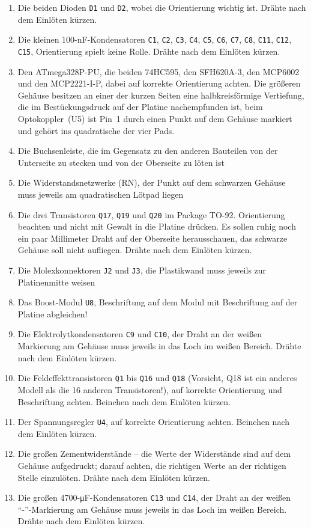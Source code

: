 \documentclass[paper=a4, open=any]{scrbook}
\begin{document}
\begin{enumerate}
						\item Die beiden Dioden \texttt{D1} und \texttt{D2}, wobei die Orientierung wichtig ist. Drähte nach dem Einlöten kürzen.
						\item Die kleinen 100-nF-Kondensatoren \texttt{C1}, \texttt{C2}, \texttt{C3}, \texttt{C4}, \texttt{C5}, \texttt{C6}, \texttt{C7}, \texttt{C8}, \texttt{C11}, \texttt{C12}, \texttt{C15}, Orientierung spielt keine Rolle. Drähte nach dem Einlöten kürzen.
						\item Den ATmega328P-PU, die beiden 74HC595, den SFH620A-3, den MCP6002 und den MCP2221-I-P, dabei auf korrekte Orientierung achten. Die größeren Gehäuse besitzen an einer der kurzen Seiten eine halbkreisförmige Vertiefung, die im Bestückungsdruck auf der Platine nachempfunden ist, beim Optokoppler~(U5) ist Pin~1 durch einen Punkt auf dem Gehäuse markiert und gehört ins quadratische der vier Pads.
						\item Die Buchsenleiste, die im Gegensatz zu den anderen Bauteilen von der Unterseite zu stecken und von der Oberseite zu löten ist
						\item Die Widerstandsnetzwerke (RN), der Punkt auf dem schwarzen Gehäuse muss jeweils am quadratischen Lötpad liegen
						\item Die drei Transistoren \texttt{Q17}, \texttt{Q19} und \texttt{Q20} im Package TO-92. Orientierung beachten und nicht mit Gewalt in die Platine drücken. Es sollen ruhig noch ein paar Millimeter Draht auf der Oberseite herausschauen, das schwarze Gehäuse soll nicht aufliegen. Drähte nach dem Einlöten kürzen.
						\item Die Molexkonnektoren \texttt{J2} und \texttt{J3}, die Plastikwand muss jeweils zur Platinenmitte weisen
						\item Das Boost-Modul \texttt{U8}, Beschriftung auf dem Modul mit Beschriftung auf der Platine abgleichen!
						\item Die Elektrolytkondensatoren \texttt{C9} und \texttt{C10}, der Draht an der weißen Markierung am Gehäuse muss jeweils in das Loch im weißen Bereich.  Drähte nach dem Einlöten kürzen.
						\item Die Feldeffekttransistoren \texttt{Q1} bis \texttt{Q16} und \texttt{Q18} (Vorsicht, Q18 ist ein anderes Modell als die 16 anderen Transistoren!), auf korrekte Orientierung und Beschriftung achten. Beinchen nach dem Einlöten kürzen.
						\item Der Spannungsregler \texttt{U4}, auf korrekte Orientierung achten. Beinchen nach dem Einlöten kürzen.
						\item Die großen Zementwiderstände -- die Werte der Widerstände sind auf dem Gehäuse aufgedruckt; darauf achten, die richtigen Werte an der richtigen Stelle einzulöten.  Drähte nach dem Einlöten kürzen.
						\item Die großen 4700-\si{\micro\farad}-Kondensatoren \texttt{C13} und \texttt{C14}, der Draht an der weißen \enquote{-}-Markierung am Gehäuse muss jeweils in das Loch im weißen Bereich. Drähte nach dem Einlöten kürzen.
					\end{enumerate}
\end{document}

